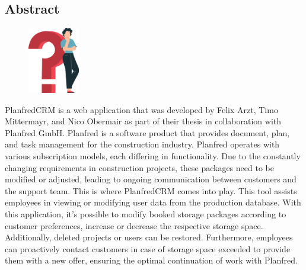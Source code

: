 \begin{spacing}{1}
    \chapter*{Abstract}
\end{spacing}
\begin{figure}
    \begin{center}
      \includegraphics[width=0.2\textwidth]{pics/question_mark.png}
    \end{center}
\end{figure}
PlanfredCRM is a web application that was developed by Felix Arzt, Timo Mittermayr, and Nico Obermair as part of their thesis in collaboration with Planfred GmbH. Planfred is a software product that provides document, plan, and task management for the construction industry. Planfred operates with various subscription models, each differing in functionality. Due to the constantly changing requirements in construction projects, these packages need to be modified or adjusted, leading to ongoing communication between customers and the support team. This is where PlanfredCRM comes into play. This tool assists employees in viewing or modifying user data from the production database. With this application, it's possible to modify booked storage packages according to customer preferences, increase or decrease the respective storage space. Additionally, deleted projects or users can be restored. Furthermore, employees can proactively contact customers in case of storage space exceeded to provide them with a new offer, ensuring the optimal continuation of work with Planfred.

